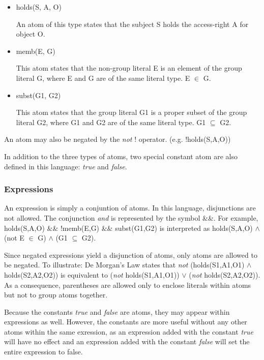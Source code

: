 \documentclass[a4paper]{article}
\begin{document}
        \begin{itemize}

          \item holds(S, A, O)

            An atom of this type states that the subject S holds the
            access-right A for object O.

          \item memb(E, G)

          This atom states that the non-group literal E is an element of the
          group literal G, where E and G are of the same literal type.
          E $\in$ G.

          \item subst(G1, G2)

          This atom states that the group literal G1 is a proper subset of the
          group literal G2, where G1 and G2 are of the same literal type.
          G1 $\subseteq$ G2.

        \end{itemize}

        An atom may also be negated by the \emph{not} ! operator. (e.g.
        !holds(S,A,O))

        In addition to the three types of atoms, two special constant atom are
        also defined in this language: \emph{true} and \emph{false}.

      \subsubsection{Expressions}

        An expression is simply a conjuntion of atoms. In this language,
        disjunctions are not allowed. The conjunction \emph{and} is 
        represented by the symbol \&\&. For example, holds(S,A,O) \&\& 
        !memb(E,G) \&\& subst(G1,G2) is interpreted as holds(S,A,O) $\land$
        (not E $\in$ G) $\land$ (G1 $\subseteq$ G2).

        Since negated expressions yield a disjunction of atoms, only
        atoms are allowed to be negated. To illustrate: De Morgan's Law
        states that \emph{not} (holds(S1,A1,O1) $\land$ holds(S2,A2,O2)) is
        equivalent to (\emph{not} holds(S1,A1,O1)) $\lor$ (\emph{not}
        holds(S2,A2,O2)). As a consequence, parentheses are allowed only
        to enclose literals within atoms but not to group atoms together. 

        Because the constants \emph{true} and \emph{false} are atoms, they may 
        appear within expressions as well. However, the constants are more
        useful without any other atoms within the same exression, as an
        expression added with the constant \emph{true} will have no effect
        and an expression added with the constant \emph{false} will set the
        entire expression to false.
\end{document}

